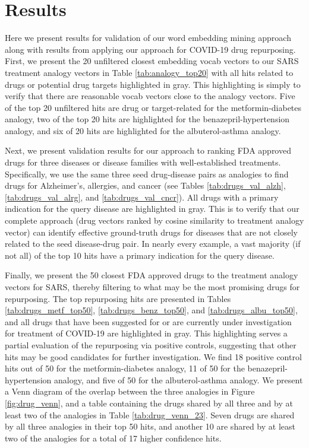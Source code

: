 \documentclass{article}
\begin{document}
\section{Results}

Here we present results for validation of our word embedding mining approach along with results from applying our approach for COVID-19 drug repurposing.
First, we present the 20 unfiltered closest embedding vocab vectors to our SARS treatment analogy vectors in Table \ref{tab:analogy_top20} with all hits related to drugs or potential drug targets highlighted in gray.
This highlighting is simply to verify that there are reasonable vocab vectors close to the analogy vectors.
Five of the top 20 unfiltered hits are drug or target-related for the metformin-diabetes analogy, two of the top 20 hits are highlighted for the benazepril-hypertension analogy, and six of 20 hits are highlighted for the albuterol-asthma analogy.

Next, we present validation results for our approach to ranking FDA approved drugs for three diseases or disease families with well-established treatments.
Specifically, we use the same three seed drug-disease pairs as analogies to find drugs for Alzheimer's, allergies, and cancer (see Tables \ref{tab:drugs_val_alzh}, \ref{tab:drugs_val_alrg}, and \ref{tab:drugs_val_cncr}).
All drugs with a primary indication for the query disease are highlighted in gray.
This is to verify that our complete approach (drug vectors ranked by cosine similarity to treatment analogy vector) can identify effective ground-truth drugs for diseases that are not closely related to the seed disease-drug pair.
In nearly every example, a vast majority (if not all) of the top 10 hits have a primary indication for the query disease.

Finally, we present the 50 closest FDA approved drugs to the treatment analogy vectors for SARS, thereby filtering to what may be the most promising drugs for repurposing.
The top repurposing hits are presented in Tables \ref{tab:drugs_metf_top50}, \ref{tab:drugs_benz_top50}, and \ref{tab:drugs_albu_top50}, and all drugs that have been suggested for or are currently under investigation for treatment of COVID-19 are highlighted in gray.
This highlighting serves a partial evaluation of the repurposing via positive controls, suggesting that other hits may be good candidates for further investigation.
We find 18 positive control hits out of 50 for the metformin-diabetes analogy, 11 of 50 for the benazepril-hypertension analogy, and five of 50 for the albuterol-asthma analogy.
We present a Venn diagram of the overlap between the three analogies in Figure \ref{fig:drug_venn}, and a table containing the drugs shared by all three and by at least two of the analogies in Table \ref{tab:drug_venn_23}.
Seven drugs are shared by all three analogies in their top 50 hits, and another 10 are shared by at least two of the analogies for a total of 17 higher confidence hits.
\end{document}
